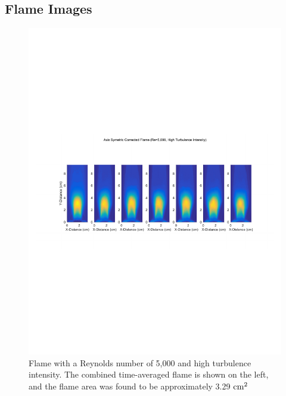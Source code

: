 \documentclass[12pt]{ussci} %
\begin{document}
\clearpage
\begin{appendices}

\section{Flame Images}\label{app:Flames}

\begin{figure}[ht]
\centering
\includegraphics[width=.95\textwidth]{Re5kHigh.pdf}
\caption{Flame with a Reynolds number of 5,000 and high turbulence intensity.  The combined time-averaged flame is shown on the left, and the flame area was found to be approximately 3.29 $\textnormal{cm}^2$}
\label{fig:5high}
\end{figure}


\end{appendices}
\end{document}
